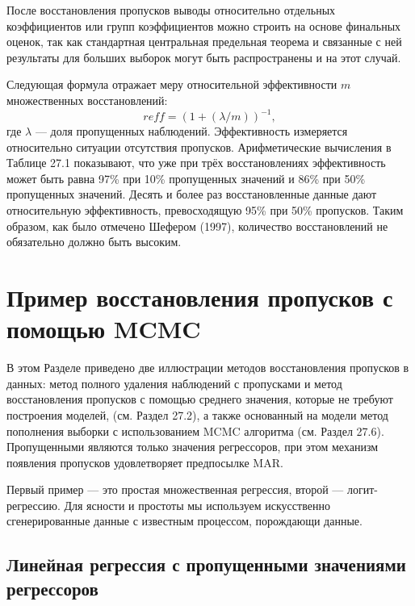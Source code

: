 После восстановления пропусков выводы относительно отдельных коэффициентов или групп коэффициентов можно строить на основе финальных оценок, так как стандартная центральная предельная теорема и связанные с ней результаты для больших выборок  могут быть распространены и на этот случай.

Следующая формула отражает меру относительной эффективности $m$ множественных восстановлений:
\begin{equation}
reff=(1+(\lambda/m))^{-1},
\end{equation}
где $\lambda$ --- доля пропущенных наблюдений. Эффективность измеряется относительно ситуации отсутствия пропусков. Арифметические вычисления в Таблице 27.1 показывают, что уже при трёх восстановлениях эффективность может быть равна 97\% при 10\% пропущенных значений и 86\% при 50\% пропущенных значений. Десять и более раз восстановленные данные дают относительную эффективность, превосходящую 95\% при 50\% пропусков. Таким образом, как было отмечено Шефером (1997), количество восстановлений не обязательно должно быть высоким.

\section{Пример восстановления пропусков с помощью MCMC} 

В этом Разделе приведено две иллюстрации  методов восстановления пропусков в данных: метод полного удаления наблюдений с пропусками и метод восстановления пропусков с помощью среднего значения, которые не требуют построения моделей, (см. Раздел 27.2), а также основанный на модели метод пополнения выборки с использованием MCMC алгоритма (см. Раздел 27.6). Пропущенными являются только значения  регрессоров, при этом механизм появления пропусков удовлетворяет предпосылке MAR.

Первый пример --- это  простая множественная регрессия, второй --- логит-регрессию. Для ясности и простоты мы используем искусственно сгенерированные данные с известным процессом, порождающи данные.

\subsection{Линейная регрессия с пропущенными значениями регрессоров} 



